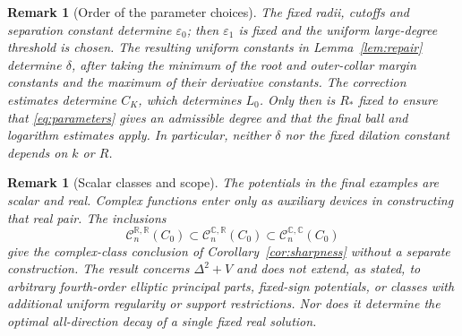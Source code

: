 \documentclass[11pt,a4paper,leqno]{amsart}
\numberwithin{equation}{section}
\theoremstyle{landisplain}
\theoremstyle{landisdefinition}
\theoremstyle{landisremark}
\newtheorem{remark}[theorem]{Remark}
\newcommand{\R}{\mathbb R}
\newcommand{\C}{\mathbb C}
\newcommand{\eps}{\varepsilon}
\begin{document}
\begin{remark}[Order of the parameter choices]\label{rem:constants}
The fixed radii, cutoffs and separation constant determine $\eps_0$;
then $\eps_1$ is fixed and the uniform large-degree threshold is
chosen. The resulting uniform constants in
Lemma~\ref{lem:repair} determine $\delta$, after taking the minimum
of the root and outer-collar margin constants and the maximum of
their derivative constants. The correction estimates determine
$C_K$, which determines $L_0$. Only then is $R_*$ fixed to
ensure that \eqref{eq:parameters} gives an admissible degree and that
the final ball and logarithm estimates apply. In particular, neither
$\delta$ nor the fixed dilation constant depends on $k$ or $R$.
\end{remark}

\begin{remark}[Scalar classes and scope]
The potentials in the final examples are scalar and real.
Complex functions enter only as auxiliary devices in constructing
that real pair. The inclusions
\[
 \mathcal C_n^{\R,\R}(C_0)
 \subset\mathcal C_n^{\C,\R}(C_0)
 \subset\mathcal C_n^{\C,\C}(C_0)
\]
give the complex-class conclusion of Corollary~\ref{cor:sharpness}
without a separate construction. The result concerns
$\Delta^2+V$ and does not extend, as stated, to arbitrary
fourth-order elliptic principal parts, fixed-sign potentials, or
classes with additional uniform regularity or support restrictions.
Nor does it determine the optimal all-direction decay of a single
fixed real solution.
\end{remark}
\end{document}
